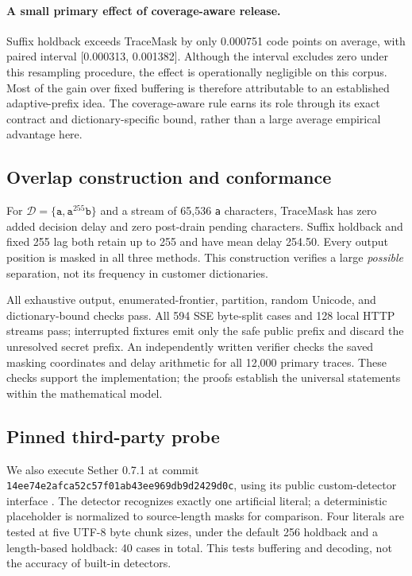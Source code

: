\documentclass[11pt,a4paper]{article}
\newcommand{\D}{\mathcal{D}}
\begin{document}
\paragraph{A small primary effect of coverage-aware release.}
Suffix holdback exceeds TraceMask by only 0.000751 code points on average, with paired interval [0.000313, 0.001382]. Although the interval excludes zero under this resampling procedure, the effect is operationally negligible on this corpus. Most of the gain over fixed buffering is therefore attributable to an established adaptive-prefix idea. The coverage-aware rule earns its role through its exact contract and dictionary-specific bound, rather than a large average empirical advantage here.

\subsection{Overlap construction and conformance}
For $\D=\{\texttt{a},\texttt{a}^{255}\texttt{b}\}$ and a stream of 65,536 \texttt{a} characters, TraceMask has zero added decision delay and zero post-drain pending characters. Suffix holdback and fixed 255 lag both retain up to 255 and have mean delay 254.50. Every output position is masked in all three methods. This construction verifies a large \emph{possible} separation, not its frequency in customer dictionaries.

All exhaustive output, enumerated-frontier, partition, random Unicode, and dictionary-bound checks pass. All 594 SSE byte-split cases and 128 local HTTP streams pass; interrupted fixtures emit only the safe public prefix and discard the unresolved secret prefix. An independently written verifier checks the saved masking coordinates and delay arithmetic for all 12,000 primary traces. These checks support the implementation; the proofs establish the universal statements within the mathematical model.

\subsection{Pinned third-party probe}
We also execute Sether 0.7.1 at commit \texttt{14ee74e2afca52c57f01ab43ee969db9d2429d0c}, using its public custom-detector interface \cite{sether}. The detector recognizes exactly one artificial literal; a deterministic placeholder is normalized to source-length masks for comparison. Four literals are tested at five UTF-8 byte chunk sizes, under the default 256 holdback and a length-based holdback: 40 cases in total. This tests buffering and decoding, not the accuracy of built-in detectors.
\end{document}
